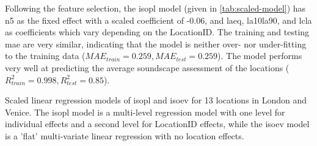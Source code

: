    Following the feature selection, the \gls{isopl} model (given in \cref{tab:scaled-model}) has \gls{n5} as the fixed effect with a scaled coefficient of -0.06, and \gls{laeq}, \gls{la10la90}, and \gls{lcla} as coefficients which vary depending on the LocationID. The training and testing \gls{mae} are very similar, indicating that the model is neither over- nor under-fitting to the training data ($MAE_{train}=0.259, MAE_{test}=0.259$). The model performs very well at predicting the average soundscape assessment of the locations ($R^2_{train}=0.998, R^2_{test}=0.85$).

   \begin{table}[h!]
  \centering
\caption{Scaled linear regression models of \gls{isopl} and \gls{isoev} for 13 locations in London and Venice. The \gls{isopl} model is a multi-level regression model with one level for individual effects and a second level for LocationID effects, while the \gls{isoev} model is a 'flat' multi-variate linear regression with no location effects. \label{tab:scaled-model}}


\end{table}
